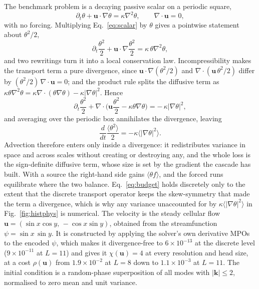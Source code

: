 \documentclass[aps,prfluids,reprint,onecolumn,amsmath,amssymb,nofootinbib,floatfix]{revtex4-2}
\begin{document}
The benchmark problem is a decaying passive scalar on a periodic square,
\begin{equation}
  \partial_t\theta + \mathbf{u}\cdot\nabla\theta = \kappa\nabla^2\theta,
  \qquad \nabla\cdot\mathbf{u}=0,
  \label{eq:scalar}
\end{equation}
with no forcing. Multiplying Eq.~\eqref{eq:scalar} by $\theta$ gives a pointwise
statement about $\theta^2/2$,
\begin{equation}
  \partial_t\frac{\theta^2}{2} + \mathbf{u}\!\cdot\!\nabla\frac{\theta^2}{2}
  = \kappa\,\theta\nabla^2\theta ,
\end{equation}
and two rewritings turn it into a local conservation law. Incompressibility
makes the transport term a pure divergence, since
$\mathbf{u}\!\cdot\!\nabla(\theta^2/2)$ and
$\nabla\!\cdot\!(\mathbf{u}\,\theta^2/2)$ differ by
$(\theta^2/2)\,\nabla\!\cdot\!\mathbf{u}=0$; and the product rule splits the
diffusive term as
$\kappa\theta\nabla^2\theta=\kappa\nabla\!\cdot\!(\theta\nabla\theta)-\kappa|\nabla\theta|^2$.
Hence
\begin{equation}
  \partial_t\frac{\theta^2}{2}
  + \nabla\!\cdot\!\Big(\mathbf{u}\frac{\theta^2}{2}-\kappa\theta\nabla\theta\Big)
  = -\,\kappa|\nabla\theta|^2 ,
  \label{eq:budget-flux}
\end{equation}
and averaging over the periodic box annihilates the divergence, leaving
\begin{equation}
  \frac{d}{dt}\frac{\langle\theta^2\rangle}{2}
  = -\kappa\langle|\nabla\theta|^2\rangle .
  \label{eq:budget}
\end{equation}
Advection therefore enters only inside a divergence: it redistributes variance
in space and across scales without creating or destroying any, and the whole
loss is the sign-definite diffusive term, whose size is set by the gradient the
cascade has built. With a source the right-hand side gains
$\langle\theta f\rangle$, and the forced runs equilibrate where the two balance.
Eq.~\eqref{eq:budget} holds discretely only to the extent that the discrete
transport operator keeps the skew-symmetry that made the term a divergence,
which is why any variance unaccounted for by
$\kappa\langle|\nabla\theta|^2\rangle$ in Fig.~\ref{fig:histphys} is numerical.
The velocity is the steady cellular flow
$\mathbf{u}=(\sin x\cos y,\,-\cos x\sin y)$, obtained from the streamfunction
$\psi=\sin x\,\sin y$. It is constructed by applying the solver's own derivative MPOs to the encoded $\psi$,
which makes it divergence-free to $6\times10^{-13}$ at the discrete level
($9\times10^{-11}$ at $L=11$) and gives it $\chi(\mathbf{u})=4$ at every
resolution and head size, at a cost $\rho(\mathbf{u})$ from
$1.9\times10^{-2}$ at $L=8$ down to $1.1\times10^{-3}$ at $L=11$. The initial
condition is a random-phase superposition of all modes with
$|\mathbf{k}|\le 2$, normalised to zero mean and unit variance.
\end{document}

